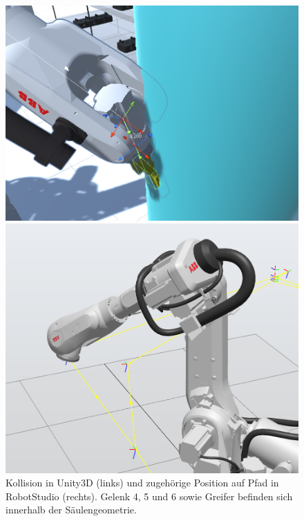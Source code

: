 \begin{figure}[!htb]
  \centering
  \begin{minipage}{.535\textwidth}
    \centering
    \includegraphics[width=0.9\linewidth]{Figures/CollisionUnity.png}
  \end{minipage}%
  \begin{minipage}{0.465\textwidth}
    \centering
    \includegraphics[width=0.9\linewidth]{Figures/CollisionPathRobotStudio.png}
  \end{minipage}
  \caption{Kollision in Unity3D (links) und zugehörige Position auf Pfad in
    RobotStudio (rechts). Gelenk 4, 5 und 6 sowie Greifer befinden
    sich innerhalb der
  Säulengeometrie.}
  \label{figure:kollision}
\end{figure}

